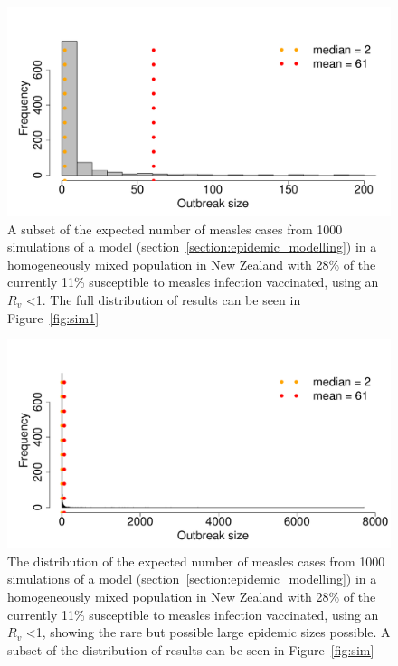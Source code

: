 \documentclass{article}
\begin{document}
\begin{figure}
     \centering
\includegraphics{draftfinalreport-063}
     \caption{A subset of the expected number of measles cases from 1000 simulations of a model (section~\autoref{section:epidemic_modelling}) in a homogeneously mixed population in New Zealand with 28\% of the currently 11\% susceptible to measles infection vaccinated, using an $R_v$ <1. The full distribution of results can be seen in Figure~\autoref{fig:sim1}}
     \label{fig:sim}
\end{figure}

\begin{figure}
     \centering
\includegraphics{draftfinalreport-064}
     \caption{The distribution of the expected number of measles cases from 1000 simulations of a model (section~\autoref{section:epidemic_modelling}) in a homogeneously mixed population in New Zealand with 28\% of the currently 11\% susceptible to measles infection vaccinated, using an $R_v$ <1, showing the rare but possible large epidemic sizes possible. A subset of the distribution of results can be seen in Figure~\autoref{fig:sim}}
     \label{fig:sim1}
\end{figure}
\end{document}
